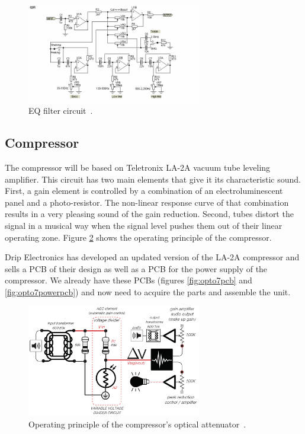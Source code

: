 \documentclass[journal]{IEEEtran}
\begin{document}
	
	\begin{figure}
		\centering
		\includegraphics[width=3in]{eq}
		\caption{EQ filter circuit~\cite{espEq}. }
		\label{fig:eq}
	\end{figure}
	
	\subsection{Compressor}
	The compressor will be based on Teletronix LA-2A vacuum tube leveling amplifier. This circuit has two main elements that give it its characteristic sound. First, a gain element is controlled by a combination of an electroluminescent panel and a photo-resistor. The non-linear response curve of that combination results in a very pleasing sound of the gain reduction.  Second, tubes distort the signal in a musical way when the signal level pushes them out of their linear operating zone. Figure \ref{fig:OpticalAttenuator} shows the operating principle of the compressor.
	
	Drip Electronics has developed an updated version of the LA-2A compressor and sells a PCB of their design as well as a PCB for the power supply of the compressor. We already have these PCBs (figures \ref{fig:opto7pcb} and \ref{fig:opto7powerpcb}) and now need to acquire the parts and assemble the unit.
	
	\begin{figure}
		\centering
		\includegraphics[width=3in]{OpticalAttenuator}
		\caption{Operating principle of the compressor's optical attenuator~\cite{opto7}. }
		\label{fig:OpticalAttenuator}
	\end{figure}
	
\end{document}
